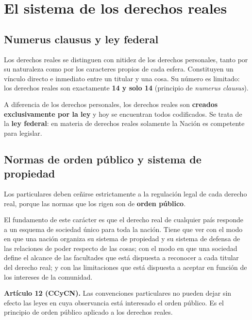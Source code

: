 \documentclass[12pt,oneside]{book}
\begin{document}
\tableofcontents
\clearpage
{}

\chapter[El sistema de los derechos reales]{El sistema de los derechos reales}

\section{Numerus clausus y ley federal}

Los derechos reales se distinguen con nitidez de los derechos personales, tanto por su naturaleza como por los caracteres propios de cada esfera. Constituyen un vínculo directo e inmediato entre un titular y una cosa. Su número es limitado: los derechos reales son exactamente \textbf{14 y solo 14} (principio de \textit{numerus clausus}).

A diferencia de los derechos personales, los derechos reales son \textbf{creados exclusivamente por la ley} y hoy se encuentran todos codificados. Se trata de la \textbf{ley federal}: en materia de derechos reales solamente la Nación es competente para legislar.

\section{Normas de orden público y sistema de propiedad}

Los particulares deben ceñirse estrictamente a la regulación legal de cada derecho real, porque las normas que los rigen son de \textbf{orden público}.

El fundamento de este carácter es que el derecho real de cualquier país responde a un esquema de sociedad único para toda la nación. Tiene que ver con el modo en que una nación organiza su sistema de propiedad y su sistema de defensa de las relaciones de poder respecto de las cosas; con el modo en que una sociedad define el alcance de las facultades que está dispuesta a reconocer a cada titular del derecho real; y con las limitaciones que está dispuesta a aceptar en función de los intereses de la comunidad.

\begin{important}
\textbf{Artículo 12 (CCyCN).} Las convenciones particulares no pueden dejar sin efecto las leyes en cuya observancia está interesado el orden público. Es el principio de orden público aplicado a los derechos reales.
\end{important}
\end{document}
